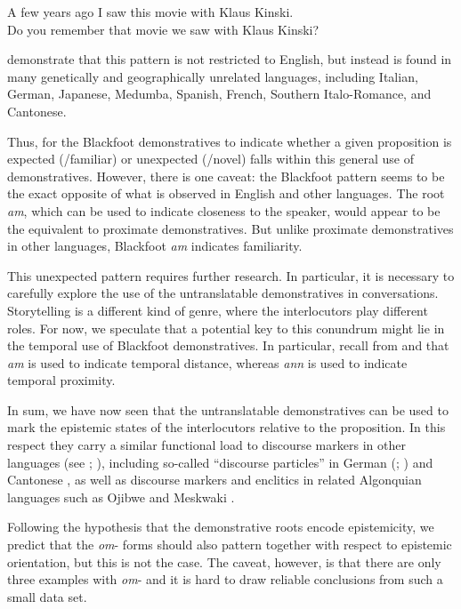 \documentclass[output=paper,colorlinks,citecolor=brown]{langscibook}
\begin{document}
\ea\label{ex:bliss:14}
\ea\label{ex:bliss:14a} A few years ago I saw this movie with Klaus Kinski.\\
\ex\label{ex:bliss:14b} Do you remember that movie we saw with Klaus Kinski?\\
\z
\z

\citet{ColasantiWiltschko2019} demonstrate that this pattern is not restricted to English, but instead is found in many genetically and geographically unrelated languages, including Italian, German, Japanese, Medumba, Spanish, French, Southern Italo-Romance, and Cantonese. 

Thus, for the Blackfoot demonstratives to indicate whether a given proposition is expected (/familiar) or unexpected (/novel) falls within this general use of demonstratives. However, there is one caveat: the Blackfoot pattern seems to be the exact opposite of what is observed in English and other languages. The root \textit{am}, which can be used to indicate closeness to the speaker, would appear to be the equivalent to proximate demonstratives. But unlike proximate demonstratives in other languages, Blackfoot \textit{am} indicates familiarity. 

This unexpected pattern requires further research. In particular, it is necessary to carefully explore the use of the untranslatable demonstratives in conversations. Storytelling is a different kind of genre, where the interlocutors play different roles. For now, we speculate that a potential key to this conundrum might lie in the temporal use of Blackfoot demonstratives. In particular, recall from  and  that \textit{am} is used to indicate temporal distance, whereas \textit{ann} is used to indicate temporal proximity. 

In sum, we have now seen that the untranslatable demonstratives can be used to mark the epistemic states of the interlocutors relative to the proposition. In this respect they carry a similar functional load to discourse markers in other languages (see \citealt{Ariel1998}; \citealt{Schiffrin1987}), including so-called “discourse particles” in German (\citealt{Thoma2017}; \citealt{Zimmermann2011}) and Cantonese \citep{Lam2014}, as well as discourse markers and enclitics in related Algonquian languages such as Ojibwe \citep{Fairbanks2016} and Meskwaki \citep{Goddard2015}.

Following the hypothesis that the demonstrative roots encode epistemicity, we predict that the \textit{om}- forms should also pattern together with respect to epistemic orientation, but this is not the case. The caveat, however, is that there are only three examples with \textit{om}- and it is hard to draw reliable conclusions from such a small data set. 
\end{document}
